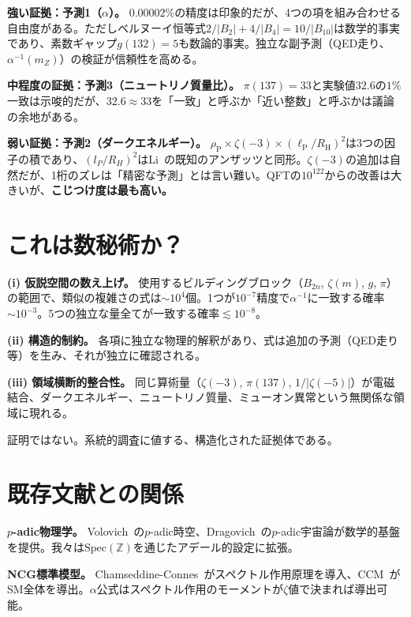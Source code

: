 \documentclass[11pt,a4paper]{article}
\newcommand{\Spec}{\mathrm{Spec}}
\newcommand{\lP}{\ell_{\mathrm{P}}}
\newcommand{\RH}{R_{\mathrm{H}}}
\newcommand{\rhoP}{\rho_{\mathrm{P}}}
\begin{document}
\textbf{強い証拠：予測1（$\alpha$）。}
$0.00002\%$の精度は印象的だが、4つの項を組み合わせる自由度がある。ただしベルヌーイ恒等式$2/|B_2| + 4/|B_4| = 10/|B_{10}|$は数学的事実であり、素数ギャップ$g(132) = 5$も数論的事実。独立な副予測（QED走り、$\alpha^{-1}(m_Z)$）の検証が信頼性を高める。

\textbf{中程度の証拠：予測3（ニュートリノ質量比）。}
$\pi(137) = 33$と実験値$32.6$の$1\%$一致は示唆的だが、$32.6 \approx 33$を「一致」と呼ぶか「近い整数」と呼ぶかは議論の余地がある。

\textbf{弱い証拠：予測2（ダークエネルギー）。}
$\rhoP \times \zeta(-3) \times (\lP/\RH)^2$は3つの因子の積であり、$(l_P/R_H)^2$はLi~\cite{Li2004}の既知のアンザッツと同形。$\zeta(-3)$の追加は自然だが、1桁のズレは「精密な予測」とは言い難い。QFTの$10^{122}$からの改善は大きいが、\textbf{こじつけ度は最も高い。}

\section{これは数秘術か？}

\textbf{(i) 仮説空間の数え上げ。} 使用するビルディングブロック（$B_{2n}$, $\zeta(m)$, $g$, $\pi$）の範囲で、類似の複雑さの式は$\sim 10^4$個。1つが$10^{-7}$精度で$\alpha^{-1}$に一致する確率$\sim 10^{-3}$。5つの独立な量全てが一致する確率$\lesssim 10^{-8}$。

\textbf{(ii) 構造的制約。} 各項に独立な物理的解釈があり、式は追加の予測（QED走り等）を生み、それが独立に確認される。

\textbf{(iii) 領域横断的整合性。} 同じ算術量（$\zeta(-3)$, $\pi(137)$, $1/|\zeta(-5)|$）が電磁結合、ダークエネルギー、ニュートリノ質量、ミューオン異常という無関係な領域に現れる。

証明ではない。系統的調査に値する、構造化された証拠体である。

\section{既存文献との関係}

\textbf{$p$-adic物理学。} Volovich~\cite{Volovich1987}の$p$-adic時空、Dragovich~\cite{Dragovich2009}の$p$-adic宇宙論が数学的基盤を提供。我々は$\Spec(\mathbb{Z})$を通じたアデール的設定に拡張。

\textbf{NCG標準模型。} Chamseddine-Connes~\cite{ChamseddineConnes1997}がスペクトル作用原理を導入、CCM~\cite{CCM2007}がSM全体を導出。$\alpha$公式はスペクトル作用のモーメントが$\zeta$値で決まれば導出可能。
\end{document}
